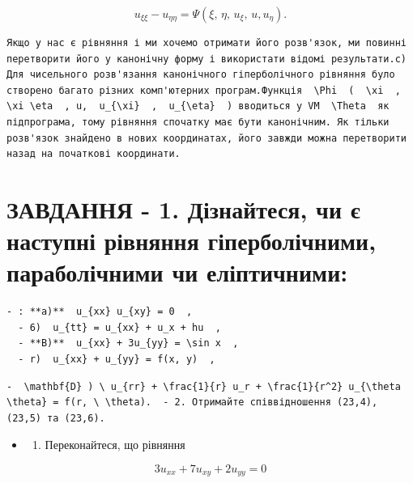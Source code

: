\documentclass[
  ukrainian,
]{article}
\providecommand{\tightlist}{%
  \setlength{\itemsep}{0pt}\setlength{\parskip}{0pt}}
\begin{document}
\[
u_{\xi\xi} - u_{\eta\eta} = \Psi(\xi, \, \eta, \, u_{\xi}, \, u, u_{\eta}).
\]

\begin{verbatim}
Якщо у нас є рівняння і ми хочемо отримати його розв'язок, ми повинні перетворити його у канонічну форму і використати відомі результати.c) Для чисельного розв'язання канонічного гіперболічного рівняння було створено багато різних комп'ютерних програм.Функція  \Phi  (  \xi  ,  \xi \eta  , u,  u_{\xi}  ,  u_{\eta}  ) вводиться у VM  \Theta  як підпрограма, тому рівняння спочатку має бути канонічним. Як тільки розв'язок знайдено в нових координатах, його завжди можна перетворити назад на початкові координати.
\end{verbatim}

\section{ЗАВДАННЯ - 1. Дізнайтеся, чи є наступні рівняння
гіперболічними, параболічними чи
еліптичними:}\label{ux437ux430ux432ux434ux430ux43dux43dux44f---1.-ux434ux456ux437ux43dux430ux439ux442ux435ux441ux44f-ux447ux438-ux454-ux43dux430ux441ux442ux443ux43fux43dux456-ux440ux456ux432ux43dux44fux43dux43dux44f-ux433ux456ux43fux435ux440ux431ux43eux43bux456ux447ux43dux438ux43cux438-ux43fux430ux440ux430ux431ux43eux43bux456ux447ux43dux438ux43cux438-ux447ux438-ux435ux43bux456ux43fux442ux438ux447ux43dux438ux43cux438}

\begin{verbatim}
- : **a)**  u_{xx} u_{xy} = 0  ,
  - 6)  u_{tt} = u_{xx} + u_x + hu  ,
  - **B)**  u_{xx} + 3u_{yy} = \sin x  ,
  - r)  u_{xx} + u_{yy} = f(x, y)  ,
\end{verbatim}

\begin{verbatim}
-  \mathbf{D} ) \ u_{rr} + \frac{1}{r} u_r + \frac{1}{r^2} u_{\theta \theta} = f(r, \ \theta).  - 2. Отримайте співвідношення (23,4), (23,5) та (23,6).
\end{verbatim}

\begin{itemize}
\tightlist
\item
  \begin{enumerate}
  \def\labelenumi{\arabic{enumi}.}
  \setcounter{enumi}{2}
  \tightlist
  \item
    Переконайтеся, що рівняння
  \end{enumerate}
\end{itemize}

\[
3u_{xx} + 7u_{xy} + 2u_{yy} = 0
\]
\end{document}
